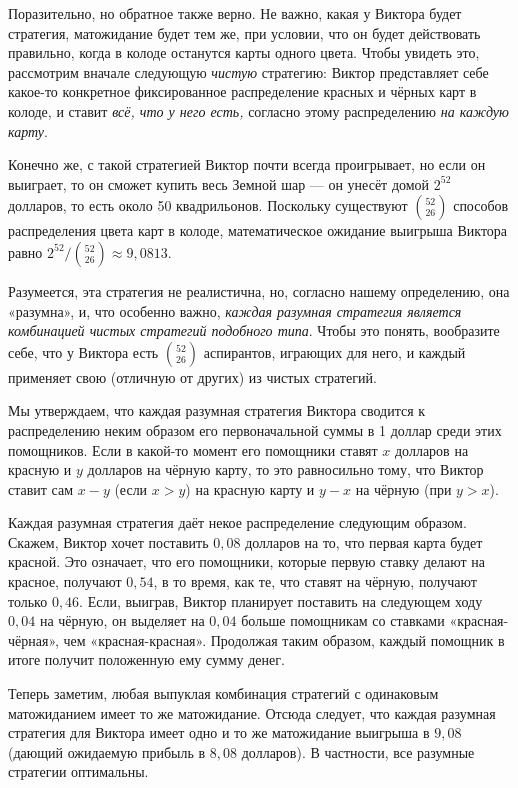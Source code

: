 Поразительно, но обратное также верно.
Не важно, какая у Виктора будет стратегия, матожидание будет тем же, при условии, что он будет действовать правильно, когда в колоде останутся карты одного цвета.
Чтобы увидеть это, рассмотрим вначале следующую \emph{чистую} стратегию: Виктор представляет себе какое-то конкретное фиксированное распределение красных и чёрных карт в колоде, и ставит \emph{всё, что у него есть,} согласно этому распределению \emph{на каждую карту}.

Конечно же, с такой стратегией Виктор почти всегда проигрывает, но если он выиграет, то он сможет купить весь Земной шар --- он унесёт домой $2^{52}$ долларов, то есть около 50 квадрильонов.
Поскольку существуют $\binom{52}{26}$ способов распределения цвета карт в колоде, математическое ожидание выигрыша Виктора равно $2^{52}/\binom{52}{26} \approx 9{,}0813$.

Разумеется, эта стратегия не реалистична, но, согласно нашему определению, она «разумна», и, что особенно важно, \emph{каждая разумная стратегия является комбинацией чистых стратегий подобного типа}.
Чтобы это понять, вообразите себе, что у Виктора есть $\binom{52}{26}$ аспирантов, играющих для него, и каждый применяет свою (отличную от других) из чистых стратегий.

Мы утверждаем, что каждая разумная стратегия Виктора сводится к распределению неким образом его первоначальной суммы в 1 доллар среди этих помощников.
Если в какой-то момент его помощники ставят $x$ долларов на красную и $y$ долларов на чёрную карту, то это равносильно тому, что Виктор ставит сам $x-y$ (если $x > y$) на красную карту и $y-x$ на чёрную (при $y>x$).

Каждая разумная стратегия даёт некое распределение следующим образом.
Скажем, Виктор хочет поставить $0{,}08$ долларов на то, что первая карта будет красной.
Это означает, что его помощники, которые первую ставку делают на красное, получают $0{,}54$, в то время, как те, что ставят на чёрную, получают только $0{,}46$.
Если, выиграв, Виктор планирует поставить на следующем ходу $0{,}04$ на чёрную, он выделяет на $0{,}04$ больше помощникам со ставками «красная-чёрная», чем «красная-красная».
Продолжая таким образом, каждый помощник в итоге получит положенную ему сумму денег.

Теперь заметим, любая выпуклая комбинация стратегий с одинаковым матожиданием имеет то же матожидание.
Отсюда следует, что каждая разумная стратегия для Виктора имеет одно и то же матожидание выигрыша в $9{,}08$ (дающий ожидаемую прибыль в $8{,}08$ долларов).
В частности, все разумные стратегии оптимальны.

